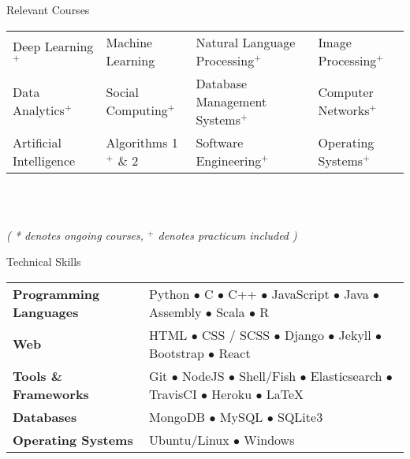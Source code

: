 \documentclass{resume} %
\begin{document}
\begin{rSection}{Relevant Courses}
\begin{tabular}{p{3.7cm} p{3.5cm} p{5.7cm} p{3.6cm}}
Deep Learning$^+$ & Machine Learning & Natural Language Processing$^+$ & Image Processing\*$^+$ \\
Data Analytics$^+$ & Social Computing$^+$ & Database Management Systems$^+$ & Computer Networks$^+$  \\
Artificial Intelligence & Algorithms 1$^+$ \& 2 & Software Engineering$^+$ & Operating Systems$^+$ 
\end{tabular}\\\\
\centerline{\footnotesize \textit{ ( * denotes ongoing courses, $^+$ denotes practicum included )  }}
\end{rSection}


\begin{rSection}{Technical Skills}

\begin{tabular}{ @{} >{\bfseries}l @{\hspace{6ex}} l }
Programming Languages & Python $\bullet$ C $\bullet$ C++ $\bullet$ JavaScript $\bullet$ Java $\bullet$ Assembly $\bullet$ Scala $\bullet$ R \\
Web & HTML $\bullet$ CSS / SCSS $\bullet$ Django $\bullet$ Jekyll $\bullet$ Bootstrap $\bullet$ React \\
Tools \& Frameworks & Git $\bullet$ NodeJS $\bullet$ Shell/Fish $\bullet$ Elasticsearch $\bullet$ TravisCI $\bullet$ Heroku $\bullet$ \LaTeX \\
Databases & MongoDB $\bullet$ MySQL $\bullet$ SQLite3 \\
Operating Systems & Ubuntu/Linux $\bullet$ Windows
\end{tabular}

\end{rSection}
\end{document}
